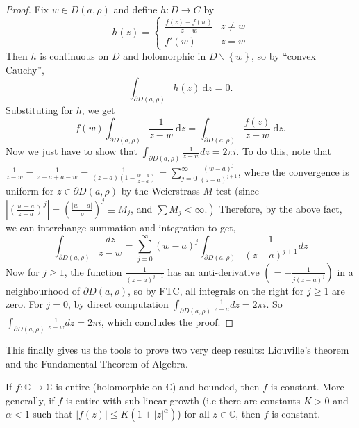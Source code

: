 \documentclass[egregdoesnotlikesansseriftitles,a4paper]{scrartcl}
\begin{document}
\begin{proof}
     Fix $w \in D (a, \rho)$ and define $h: D \rightarrow C$ by 
     \begin{equation*}
           h (z)=
           \begin{cases}
                \frac{f (z)-f (w)}{z-w}& z \neq w\\
                f' (w) & z=w
           \end{cases}
     \end{equation*}
     Then $h$ is continuous on $D$ and holomorphic in $D \backslash \left\{w\right\}$, so by ``convex Cauchy'', \[
     \int_{ \partial D (a,\rho)}^{}h (z) \ \mathrm{d}z=0 
     .\] Substituting for $h$, we get \[
     f (w) \int_{ \partial D (a,\rho)}^{} \frac{1}{z-w} \ \mathrm{d}z=\int_{ \partial D (a,\rho)}^{} \frac{f (z)}{z-w} \ \mathrm{d}z
     .\] Now we just have to show that $\int_{\partial D(a, \rho)} \frac{1}{z-w} d z=2 \pi i$. To do this, note that $\frac{1}{z-w}=\frac{1}{z-a+a-w}=\frac{1}{(z-a)\left(1-\frac{w-a}{z-a}\right)}=\sum_{j=0}^{\infty} \frac{(w-a)^{j}}{(z-a)^{j+1}}$, where the convergence is uniform for $z \in \partial D(a, \rho)$ by the Weierstrass $M$-test (since $\left|\left(\frac{w-a}{z-a}\right)^{j}\right|=\left(\frac{|w-a|}{\rho}\right)^{j} \equiv M_{j}$, and $\left.\sum M_{j}<\infty .\right)$ Therefore, by the above fact, we can interchange summation and integration to get,
     $$
     \int_{\partial D(a, \rho)} \frac{d z}{z-w}=\sum_{j=0}^{\infty}(w-a)^{j} \int_{\partial D(a, \rho)} \frac{1}{(z-a)^{j+1}} d z
     $$
     Now for $j \geq 1$, the function $\frac{1}{(z-a)^{j+1}}$ has an anti-derivative $\left(=-\frac{1}{j(z-a)^{j}}\right)$ in a neighbourhood of $\partial D(a, \rho)$, so by FTC, all integrals on the right for $j \geq 1$ are zero. For $j=0$, by direct computation $\int_{\partial D(a, \rho)} \frac{1}{z-a} d z=2 \pi i$.
     So $\int_{\partial D(a, \rho)} \frac{1}{z-w} d z=2 \pi i$, which concludes the proof.
\end{proof}
This finally gives us the tools to prove two very deep results: Liouville's theorem and the Fundamental Theorem of Algebra.
\begin{theorem}
      If $f: \mathbb{C} \rightarrow \mathbb{C}$ is entire (holomorphic on $\mathbb{C}$) and bounded, then $f$ is constant. More generally, if $f$ is entire with sub-linear growth (i.e there are constants $K>0$ and $\alpha<1$ such that $\left|f (z)\right|\leq K (1+\left|z\right|^{\alpha})$) for all $z \in \mathbb{C}$, then $f$ is constant. 
\end{theorem}
\end{document}
